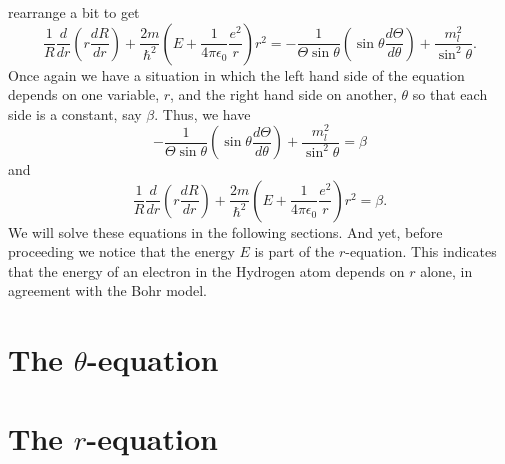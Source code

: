 rearrange a bit to get
\begin{equation}\label{c6s1e14}
\frac{1}{R}\frac{d}{dr}\left(r\frac{dR}{dr}\right) +
\frac{2m}{\hslash^2}\left(E + \frac{1}{4\pi\epsilon_0}\frac{e^2}{r}\right)r^2 =
-\frac{1}{\Theta\sin\theta}\left(\sin\theta\frac{d\Theta}{d\theta}\right) +
\frac{m_l^2}{\sin^2\theta}.
\end{equation}
Once again we have a situation in which the left hand side of the equation 
depends on one variable, $r$, and the right hand side on another, $\theta$
so that each side is a constant, say $\beta$. Thus, we have
\begin{equation}\label{c6s1e16}
-\frac{1}{\Theta\sin\theta}\left(\sin\theta\frac{d\Theta}{d\theta}\right) +
\frac{m_l^2}{\sin^2\theta} = \beta
\end{equation}
and
\begin{equation}\label{c6s1e17}
\frac{1}{R}\frac{d}{dr}\left(r\frac{dR}{dr}\right) +
\frac{2m}{\hslash^2}\left(E + \frac{1}{4\pi\epsilon_0}\frac{e^2}{r}\right)r^2 =
\beta.
\end{equation}
We will solve these equations in the following sections. And yet, before 
proceeding we notice that the energy $E$ is part of the $r$-equation. This 
indicates that the energy of an electron in the Hydrogen atom depends on $r$
alone, in agreement with the Bohr model.

\section{The $\theta$-equation}\label{c6s2}
\section{The $r$-equation}\label{c6s3}

